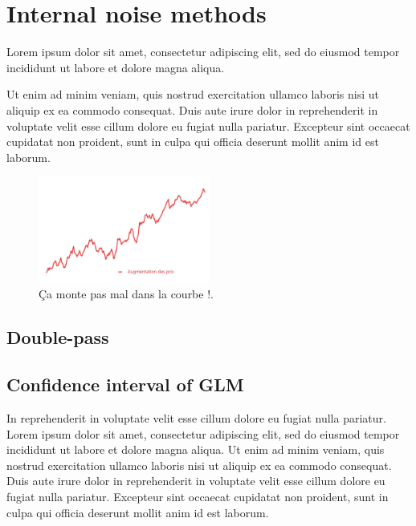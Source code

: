 \renewcommand{\chaptername}{Chapter} 
\chapter{Internal noise methods}\label{chap6}

Lorem ipsum dolor sit amet, consectetur adipiscing elit, sed do eiusmod tempor incididunt ut labore et dolore magna aliqua. 

Ut enim ad minim veniam, quis nostrud exercitation ullamco laboris nisi ut aliquip ex ea commodo consequat. Duis aute irure dolor in reprehenderit in voluptate velit esse cillum dolore eu fugiat nulla pariatur. Excepteur sint occaecat cupidatat non proident, sunt in culpa qui officia deserunt mollit anim id est laborum.
\begin{figure}[ht!]
    \centering
    \includegraphics[width=0.5\textwidth]{MainLayout/Images/courbe1.jpg}
    \caption{Ça monte pas mal dans la courbe !.}
    \label{fig:courbe-label}
\end{figure}
\section {Double-pass}


\section {Confidence interval of GLM} In reprehenderit in voluptate velit esse cillum dolore eu fugiat nulla pariatur. Lorem ipsum dolor sit amet, consectetur adipiscing elit, sed do eiusmod tempor incididunt ut labore et dolore magna aliqua. Ut enim ad minim veniam, quis nostrud exercitation ullamco laboris nisi ut aliquip ex ea commodo consequat. Duis aute irure dolor in reprehenderit in voluptate velit esse cillum dolore eu fugiat nulla pariatur. Excepteur sint occaecat cupidatat non proident, sunt in culpa qui officia deserunt mollit anim id est laborum.

